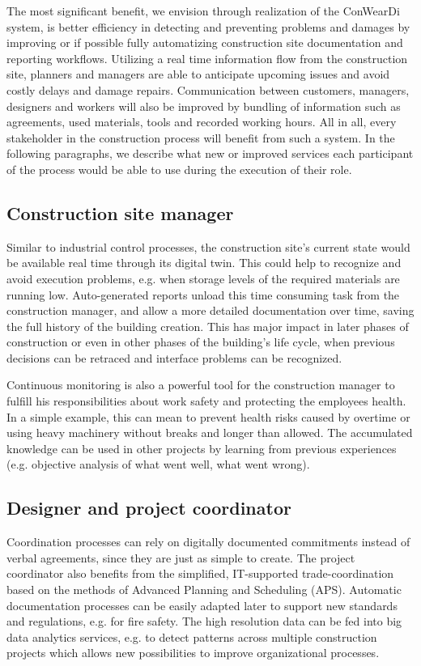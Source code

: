 The most significant benefit, we envision through realization of the ConWearDi system, is better efficiency in detecting and preventing problems and damages by improving or if possible fully automatizing construction site documentation and reporting workflows. 
Utilizing a real time information flow from the construction site, planners and managers are able to anticipate upcoming issues and avoid costly delays and damage repairs. 
Communication between customers, managers, designers and workers will also be improved by bundling of information such as agreements, used materials, tools and recorded working hours.
All in all, every stakeholder in the construction process will benefit from such a system. 
In the following paragraphs, we describe what new or improved services each participant of the process would be able to use during the execution of their role.


\subsection{Construction site manager}
Similar to industrial control processes, the construction site's current state would be available real time through its digital twin.
This could help to recognize and avoid execution problems, e.g. when storage levels of the required materials are running low.
Auto-generated reports unload this time consuming task from the construction manager, and allow a more detailed documentation over time, saving the full history of the building creation.
This has major impact in later phases of construction or even in other phases of the building's life cycle, when previous decisions can be retraced and interface problems can be recognized. 

Continuous monitoring is also a powerful tool for the construction manager to fulfill his responsibilities about work safety and protecting the employees health. In a simple example, this can mean to prevent health risks caused by overtime or using heavy machinery without breaks and longer than allowed.
The accumulated knowledge can be used in other projects by learning from previous experiences (e.g. objective analysis of what went well, what went wrong).

\subsection{Designer and project coordinator}
Coordination processes can rely on digitally documented commitments instead of verbal agreements, since they are just as simple to create.
The project coordinator also benefits from the simplified, IT-supported trade-coordination based on the methods of Advanced Planning and Scheduling (APS).
Automatic documentation processes can be easily adapted later to support new standards and regulations, e.g. for fire safety.
The high resolution data can be fed into big data analytics services, e.g. to detect patterns across multiple construction projects which allows new possibilities to improve organizational processes.

